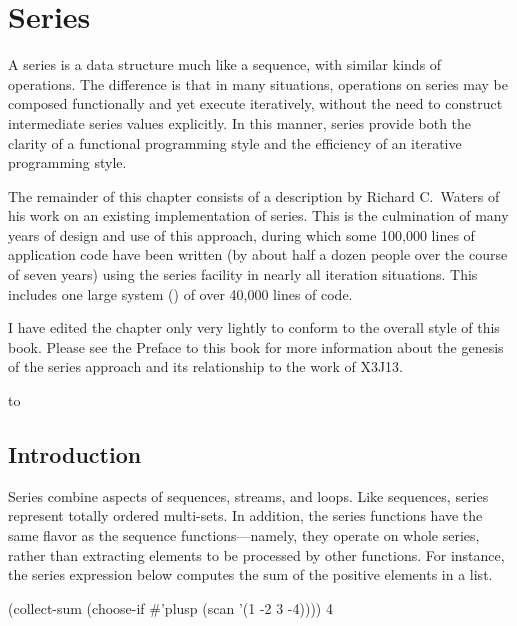 

\clearpage\def\pagestatus{FINAL PROOF}

\chapter{Series}
\label{SERIES}

\def\SU#1{\({}_{#1}\)}

\def\fooprime#1{#1'}

\begin{new}
\prefaceword A series is a data structure much like a sequence, with similar
kinds of operations.  The difference is that in many situations, operations
on series may be composed functionally and yet execute iteratively, without
the need to construct intermediate series values explicitly.  In this
manner, series provide both the clarity of a functional programming style
and the efficiency of an iterative programming style.

The remainder of this chapter consists of a description by Richard
C.~Waters of his work on an existing implementation of series.
This is the culmination of many years of design and use of this approach,
during which some 100,000 lines of application code have been written (by
about half a dozen people over the course of seven years) using the series
facility in nearly all iteration situations.  This includes one large
system () of over 40,000 lines of code.

I have edited the chapter only very lightly to conform to the overall style
of this book.  Please see the Preface to this book for more information
about the genesis of the series approach and its relationship to the work
of X3J13.
\end{new}


\noindent\hbox to \textwidth{\hss---Guy L. Steele Jr.}

\section{Introduction}

Series combine aspects of sequences, streams, and loops.  Like sequences,
series represent totally ordered multi-sets.  In addition, the series
functions have the same flavor as the sequence functions---namely, they
operate on whole series, rather than extracting elements to be
processed by other functions.  For instance, the series expression below
computes the sum of the positive elements in a list.
\begin{lisp}
(collect-sum (choose-if \#'plusp (scan '(1 -2 3 -4)))) {\EV} 4
\end{lisp}

